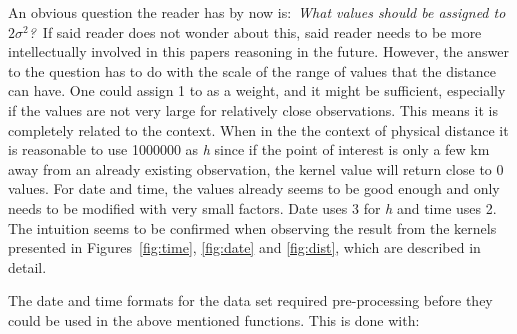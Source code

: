 \documentclass[a4paper, twocolumn]{article}
\begin{document}
	An obvious question the reader has by now is:\newline~\newline\textit{What values should be assigned to \(2\sigma^2\)?}\newline~\newline If said reader does not wonder about this, said reader needs to be more intellectually involved in this papers reasoning in the future. However, the answer to the question has to do with the scale of the range of values that the distance can have. One could assign 1 to as a weight, and it might be sufficient, especially if the values are not very large for relatively close observations. This means it is completely related to the context. When in the the context of physical distance it is reasonable to use 1000000 as \textit{h} since if the point of interest is only a few km away from an already existing observation, the kernel value will return close to 0 values. For date and time, the values already seems to be good enough and only needs to be modified with very small factors. Date uses 3 for \textit{h} and time uses 2. The intuition seems to be confirmed when observing the result from the kernels presented in Figures~\ref{fig:time}, \ref{fig:date} and \ref{fig:dist}, which are described in detail.

    The date and time formats for the data set required pre-processing before they could be used in the above mentioned functions. This is done with:
    
\end{document}
